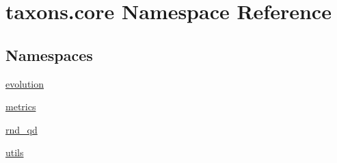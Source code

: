 \hypertarget{namespacetaxons_1_1core}{}\section{taxons.\+core Namespace Reference}
\label{namespacetaxons_1_1core}
\subsection*{Namespaces}
\begin{DoxyCompactItemize}
\item 
 \hyperlink{namespacetaxons_1_1core_1_1evolution}{evolution}
\item 
 \hyperlink{namespacetaxons_1_1core_1_1metrics}{metrics}
\item 
 \hyperlink{namespacetaxons_1_1core_1_1rnd__qd}{rnd\+\_\+qd}
\item 
 \hyperlink{namespacetaxons_1_1core_1_1utils}{utils}
\end{DoxyCompactItemize}
